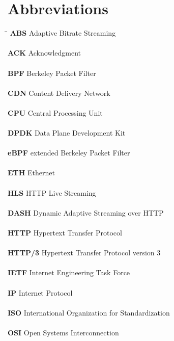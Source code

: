 \chapter*{Abbreviations}\label{chap:abbreviations}

\begin{tabbing}
    \hspace{5cm} \= \kill %
    \textbf{ABS} \> Adaptive Bitrate Streaming
    \\\\\textbf{ACK} \> Acknowledgment
    \\\\\textbf{BPF} \> Berkeley Packet Filter
    \\\\\textbf{CDN} \> Content Delivery Network
    \\\\\textbf{CPU} \> Central Processing Unit
    \\\\\textbf{DPDK} \> Data Plane Development Kit
    \\\\\textbf{eBPF} \> extended Berkeley Packet Filter
    \\\\\textbf{ETH} \> Ethernet
    \\\\\textbf{HLS} \> HTTP Live Streaming
    \\\\\textbf{DASH} \> Dynamic Adaptive Streaming over HTTP
    \\\\\textbf{HTTP} \> Hypertext Transfer Protocol
    \\\\\textbf{HTTP/3} \> Hypertext Transfer Protocol version 3
    \\\\\textbf{IETF} \> Internet Engineering Task Force
    \\\\\textbf{IP} \> Internet Protocol
    \\\\\textbf{ISO} \>International Organization for Standardization
    \\\\\textbf{OSI} \> Open Systems Interconnection

\end{tabbing}
